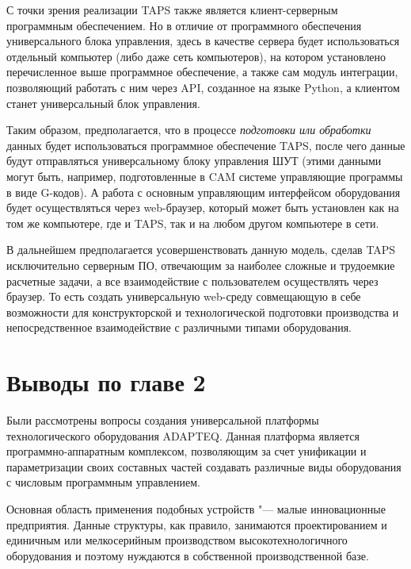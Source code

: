 С точки зрения реализации \foreignlanguage{english}{TAPS} также является клиент-серверным программным обеспечением. Но в отличие от программного обеспечения универсального блока управления, здесь в качестве сервера будет использоваться отдельный компьютер (либо даже сеть компьютеров), на котором установлено перечисленное выше программное обеспечение, а также сам модуль интеграции, позволяющий работать с ним через \foreignlanguage{english}{API}, созданное на языке \foreignlanguage{english}{Python}, а клиентом станет универсальный блок управления.

Таким образом, предполагается, что в процессе \textit{подготовки или обработки} данных будет использоваться программное обеспечение \foreignlanguage{english}{TAPS}, после чего данные будут отправляться универсальному блоку управления ШУТ (этими данными могут быть, например, подготовленные в \foreignlanguage{english}{CAM} системе управляющие программы в виде \foreignlanguage{english}{G}-кодов). А работа с основным управляющим интерфейсом оборудования будет осуществляться через \foreignlanguage{english}{web}-браузер, который может быть установлен как на том же компьютере, где и \foreignlanguage{english}{TAPS}, так и на любом другом компьютере в сети.

В дальнейшем предполагается усовершенствовать данную модель, сделав \foreignlanguage{english}{TAPS} исключительно серверным ПО, отвечающим за наиболее сложные и трудоемкие расчетные задачи, а все взаимодействие с пользователем осуществлять через браузер. То есть создать универсальную \foreignlanguage{english}{web}-среду совмещающую в себе возможности для конструкторской и технологической подготовки производства и непосредственное взаимодействие с различными типами оборудования.

\section{Выводы по главе 2}

Были рассмотрены вопросы создания универсальной платформы технологического оборудования \foreignlanguage{english}{ADAPTEQ}. Данная платформа является программно-аппаратным комплексом, позволяющим за счет унификации и параметризации своих составных частей создавать различные виды оборудования с числовым программным управлением.

Основная область применения подобных устройств "--- малые инновационные предприятия. Данные структуры, как правило, занимаются проектированием и единичным или мелкосерийным производством высокотехнологичного оборудования и поэтому нуждаются в собственной производственной базе.

